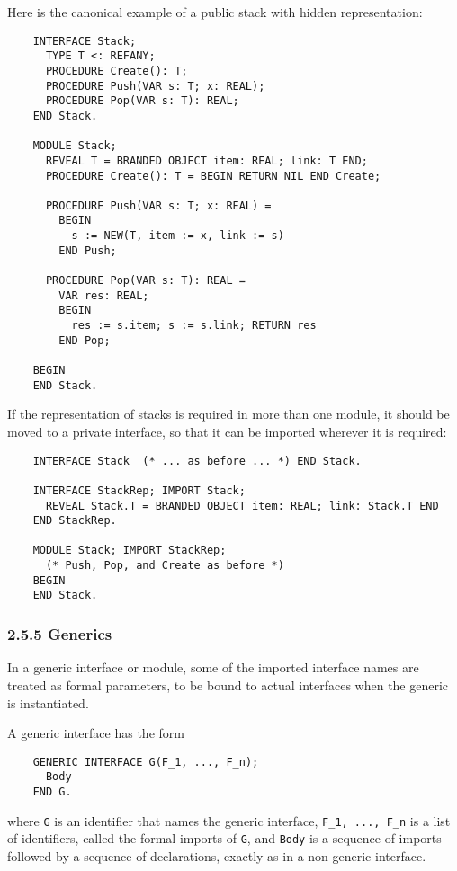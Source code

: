\documentclass[10pt]{article}
\begin{document}
Here is the canonical example of a public stack with hidden representation:
\begin{verbatim}
    INTERFACE Stack;
      TYPE T <: REFANY;
      PROCEDURE Create(): T;
      PROCEDURE Push(VAR s: T; x: REAL);
      PROCEDURE Pop(VAR s: T): REAL;
    END Stack.

    MODULE Stack;
      REVEAL T = BRANDED OBJECT item: REAL; link: T END;
      PROCEDURE Create(): T = BEGIN RETURN NIL END Create;

      PROCEDURE Push(VAR s: T; x: REAL) =
        BEGIN
          s := NEW(T, item := x, link := s)
        END Push;

      PROCEDURE Pop(VAR s: T): REAL =
        VAR res: REAL;
        BEGIN
          res := s.item; s := s.link; RETURN res
        END Pop;

    BEGIN
    END Stack.
\end{verbatim}

If the representation of stacks is required in more than one module, it should
be moved to a private interface, so that it can be imported wherever it is
required:
\begin{verbatim}
    INTERFACE Stack  (* ... as before ... *) END Stack.

    INTERFACE StackRep; IMPORT Stack;
      REVEAL Stack.T = BRANDED OBJECT item: REAL; link: Stack.T END
    END StackRep.

    MODULE Stack; IMPORT StackRep;
      (* Push, Pop, and Create as before *)
    BEGIN
    END Stack.
\end{verbatim}

\subsubsection*{2.5.5 Generics}

In a generic interface or module, some of the imported interface names are
treated as formal parameters, to be bound to actual interfaces when the
generic is instantiated.

A generic interface has the form
\begin{verbatim}
    GENERIC INTERFACE G(F_1, ..., F_n);
      Body
    END G.
\end{verbatim}
where \verb|G| is an identifier that names the generic interface,
\verb|F_1, ..., F_n| is a list of identifiers, called the formal imports of
\verb|G|, and \verb|Body| is a sequence of imports followed by a sequence of
declarations, exactly as in a non-generic interface.
\end{document}
